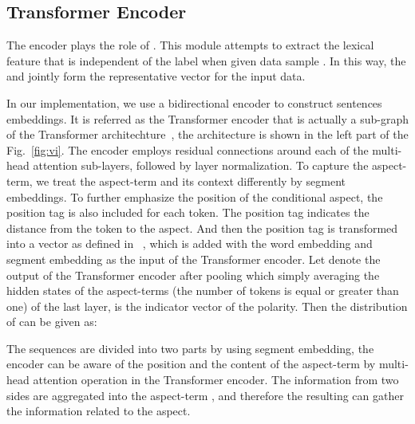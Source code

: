 \documentclass[11pt,a4paper]{article}
\begin{document}
\subsection{Transformer Encoder}
The encoder plays the role of .
This module attempts to extract the lexical feature that is independent of the label  when given data sample .
In this way, the  and  jointly form the representative vector for the input data.








In our implementation, we use a bidirectional encoder to construct sentences embeddings. It is referred as the Transformer encoder that is actually a sub-graph of the Transformer architechture~\cite{DBLP:conf/nips/VaswaniSPUJGKP17}, the architecture is shown in the left part of the Fig.~\ref{fig:vi}. The encoder employs residual connections
around each of the multi-head attention sub-layers, followed by layer normalization. To capture the aspect-term, we treat the aspect-term and its context differently by segment embeddings. To further emphasize the position of the conditional aspect, the position tag is also included for each token.
The position tag indicates the distance from the token to the aspect.
And then the position tag is transformed into a vector as defined in ~\cite{DBLP:conf/nips/VaswaniSPUJGKP17}, which is added with the word embedding and segment embedding as the input of the Transformer encoder.
Let  denote the output of the Transformer encoder after pooling which simply averaging the hidden states of the aspect-terms (the number of tokens is equal or greater than one) of the last layer,  is the indicator vector of the polarity. Then the distribution of  can be given as:


The sequences are divided into two parts by using segment embedding, the encoder can be aware of the position and the content of the aspect-term  by multi-head attention operation in the Transformer encoder.
The information from two sides are aggregated into the aspect-term , and therefore the resulting  can gather the information related to the aspect.
\end{document}
